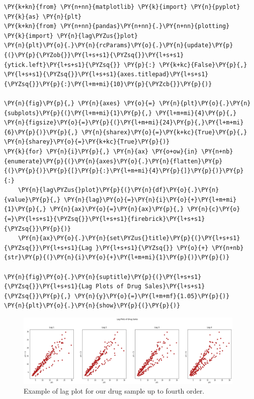 \begin{tcolorbox}[breakable, size=fbox, boxrule=1pt, pad at break*=1mm,colback=cellbackground, colframe=cellborder]
\begin{Verbatim}[commandchars=\\\{\}]
\PY{k+kn}{from} \PY{n+nn}{matplotlib} \PY{k}{import} \PY{n}{pyplot} \PY{k}{as} \PY{n}{plt}
\PY{k+kn}{from} \PY{n+nn}{pandas}\PY{n+nn}{.}\PY{n+nn}{plotting} \PY{k}{import} \PY{n}{lag\PYZus{}plot}
\PY{n}{plt}\PY{o}{.}\PY{n}{rcParams}\PY{o}{.}\PY{n}{update}\PY{p}{(}\PY{p}{\PYZob{}}\PY{l+s+s1}{\PYZsq{}}\PY{l+s+s1}{ytick.left}\PY{l+s+s1}{\PYZsq{}} \PY{p}{:} \PY{k+kc}{False}\PY{p}{,} \PY{l+s+s1}{\PYZsq{}}\PY{l+s+s1}{axes.titlepad}\PY{l+s+s1}{\PYZsq{}}\PY{p}{:}\PY{l+m+mi}{10}\PY{p}{\PYZcb{}}\PY{p}{)}

\PY{n}{fig}\PY{p}{,} \PY{n}{axes} \PY{o}{=} \PY{n}{plt}\PY{o}{.}\PY{n}{subplots}\PY{p}{(}\PY{l+m+mi}{1}\PY{p}{,} \PY{l+m+mi}{4}\PY{p}{,} \PY{n}{figsize}\PY{o}{=}\PY{p}{(}\PY{l+m+mi}{24}\PY{p}{,}\PY{l+m+mi}{6}\PY{p}{)}\PY{p}{,} \PY{n}{sharex}\PY{o}{=}\PY{k+kc}{True}\PY{p}{,} \PY{n}{sharey}\PY{o}{=}\PY{k+kc}{True}\PY{p}{)}
\PY{k}{for} \PY{n}{i}\PY{p}{,} \PY{n}{ax} \PY{o+ow}{in} \PY{n+nb}{enumerate}\PY{p}{(}\PY{n}{axes}\PY{o}{.}\PY{n}{flatten}\PY{p}{(}\PY{p}{)}\PY{p}{[}\PY{p}{:}\PY{l+m+mi}{4}\PY{p}{]}\PY{p}{)}\PY{p}{:}
    \PY{n}{lag\PYZus{}plot}\PY{p}{(}\PY{n}{df}\PY{o}{.}\PY{n}{value}\PY{p}{,} \PY{n}{lag}\PY{o}{=}\PY{n}{i}\PY{o}{+}\PY{l+m+mi}{1}\PY{p}{,} \PY{n}{ax}\PY{o}{=}\PY{n}{ax}\PY{p}{,} \PY{n}{c}\PY{o}{=}\PY{l+s+s1}{\PYZsq{}}\PY{l+s+s1}{firebrick}\PY{l+s+s1}{\PYZsq{}}\PY{p}{)}
    \PY{n}{ax}\PY{o}{.}\PY{n}{set\PYZus{}title}\PY{p}{(}\PY{l+s+s1}{\PYZsq{}}\PY{l+s+s1}{Lag }\PY{l+s+s1}{\PYZsq{}} \PY{o}{+} \PY{n+nb}{str}\PY{p}{(}\PY{n}{i}\PY{o}{+}\PY{l+m+mi}{1}\PY{p}{)}\PY{p}{)}

\PY{n}{fig}\PY{o}{.}\PY{n}{suptitle}\PY{p}{(}\PY{l+s+s1}{\PYZsq{}}\PY{l+s+s1}{Lag Plots of Drug Sales}\PY{l+s+s1}{\PYZsq{}}\PY{p}{,} \PY{n}{y}\PY{o}{=}\PY{l+m+mf}{1.05}\PY{p}{)}    
\PY{n}{plt}\PY{o}{.}\PY{n}{show}\PY{p}{(}\PY{p}{)}
\end{Verbatim}
\end{tcolorbox}

\begin{figure}[htb]
	\centering
	\includegraphics[width=\linewidth]{figures/lag_plot.png}
	\caption{Example of lag plot for our drug sample up to fourth order.}
	\label{fig:lag_plot}
\end{figure}
    
